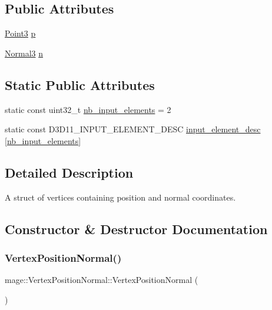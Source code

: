 \subsection*{Public Attributes}
\begin{DoxyCompactItemize}
\item 
\hyperlink{structmage_1_1_point3}{Point3} \hyperlink{structmage_1_1_vertex_position_normal_ac95e9941363ec5687f0bf21e59b83940}{p}
\item 
\hyperlink{structmage_1_1_normal3}{Normal3} \hyperlink{structmage_1_1_vertex_position_normal_a09baa618081e66e21cdfe5752dbf8df6}{n}
\end{DoxyCompactItemize}
\subsection*{Static Public Attributes}
\begin{DoxyCompactItemize}
\item 
static const uint32\+\_\+t \hyperlink{structmage_1_1_vertex_position_normal_a7ccf8843b44100cfdd8ad9bc30228f94}{nb\+\_\+input\+\_\+elements} = 2
\item 
static const D3\+D11\+\_\+\+I\+N\+P\+U\+T\+\_\+\+E\+L\+E\+M\+E\+N\+T\+\_\+\+D\+E\+SC \hyperlink{structmage_1_1_vertex_position_normal_ab4765069df93930c4fecc0029503061e}{input\+\_\+element\+\_\+desc} \mbox{[}\hyperlink{structmage_1_1_vertex_position_normal_a7ccf8843b44100cfdd8ad9bc30228f94}{nb\+\_\+input\+\_\+elements}\mbox{]}
\end{DoxyCompactItemize}


\subsection{Detailed Description}
A struct of vertices containing position and normal coordinates. 

\subsection{Constructor \& Destructor Documentation}
\hypertarget{structmage_1_1_vertex_position_normal_a470e35daf194befbf45ac3ecfd6848e3}{}\label{structmage_1_1_vertex_position_normal_a470e35daf194befbf45ac3ecfd6848e3} 
\subsubsection{\texorpdfstring{Vertex\+Position\+Normal()}{VertexPositionNormal()}\hspace{0.1cm}{\footnotesize\ttfamily [1/4]}}
{\footnotesize\ttfamily mage\+::\+Vertex\+Position\+Normal\+::\+Vertex\+Position\+Normal (\begin{DoxyParamCaption}{ }\end{DoxyParamCaption})\hspace{0.3cm}{\ttfamily [default]}}

